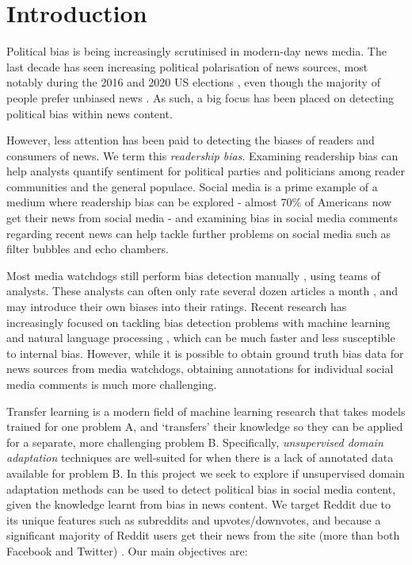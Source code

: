 \chapter{Introduction}

Political bias is being increasingly scrutinised in modern-day news media. The last decade has seen increasing political polarisation of news sources, most notably during the 2016 and 2020 US elections \cite{us-election}, even though the majority of people prefer unbiased news \cite{pew-unbiased}. As such, a big focus has been placed on detecting political bias within news content.

However, less attention has been paid to detecting the biases of readers and consumers of news. We term this \textit{readership bias}. Examining readership bias can help analysts quantify sentiment for political parties and politicians among reader communities and the general populace. Social media is a prime example of a medium where readership bias can be explored - almost 70\% of Americans now get their news from social media \cite{pew-social-media-news-2018} - and examining bias in social media comments regarding recent news can help tackle further problems on social media such as filter bubbles and echo chambers.

Most media watchdogs still perform bias detection manually \cite{mbfc} \cite{media-bias-chart}, using teams of analysts. These analysts can often only rate several dozen articles a month \cite{ad-fontes-methodology}, and may introduce their own biases into their ratings. Recent research has increasingly focused on tackling bias detection problems with machine learning and natural language processing \cite{bipartisan-press} \cite{baly-emnlp18}, which can be much faster and less susceptible to internal bias. However, while it is possible to obtain ground truth bias data for news sources from media watchdogs, obtaining annotations for individual social media comments is much more challenging.

Transfer learning is a modern field of machine learning research that takes models trained for one problem A, and `transfers' their knowledge so they can be applied for a separate, more challenging problem B. Specifically, \textit{unsupervised domain adaptation} techniques are well-suited for when there is a lack of annotated data available for problem B. In this project we seek to explore if unsupervised domain adaptation methods can be used to detect political bias in social media content, given the knowledge learnt from bias in news content. We target Reddit due to its unique features such as subreddits and upvotes/downvotes, and because a significant majority of Reddit users get their news from the site (more than both Facebook and Twitter) \cite{pew-social-media-news-2018}. Our main objectives are:

